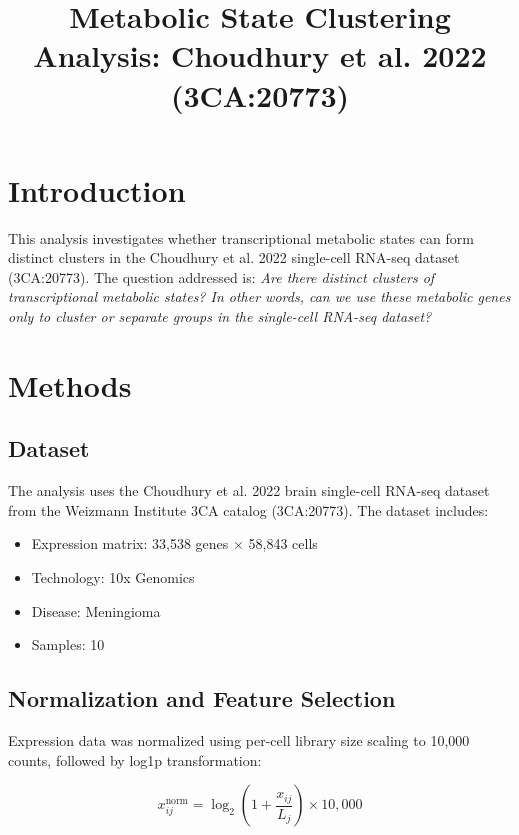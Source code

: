 \documentclass[10pt]{article}
\title{Metabolic State Clustering Analysis: Choudhury et al. 2022 (3CA:20773)}
\author{}
\date{}
\begin{document}
\sloppy

\maketitle

\section{Introduction}

This analysis investigates whether transcriptional metabolic states can form distinct clusters in the Choudhury et al. 2022 single-cell RNA-seq dataset (3CA:20773). The question addressed is: \textit{Are there distinct clusters of transcriptional metabolic states? In other words, can we use these metabolic genes only to cluster or separate groups in the single-cell RNA-seq dataset?}

\section{Methods}

\subsection{Dataset}

The analysis uses the Choudhury et al. 2022 brain single-cell RNA-seq dataset from the Weizmann Institute 3CA catalog (3CA:20773). The dataset includes:

\begin{itemize}
    \item Expression matrix: 33,538 genes $\times$ 58,843 cells
    \item Technology: 10x Genomics
    \item Disease: Meningioma
    \item Samples: 10
\end{itemize}

\subsection{Normalization and Feature Selection}

Expression data was normalized using per-cell library size scaling to 10,000 counts, followed by log1p transformation:

\begin{equation}
    \label{eq:normalization}
    x_{ij}^{\text{norm}} = \log_2\left(1 + \frac{x_{ij}}{L_j}\right) \times 10,000
\end{equation}
\end{document}
